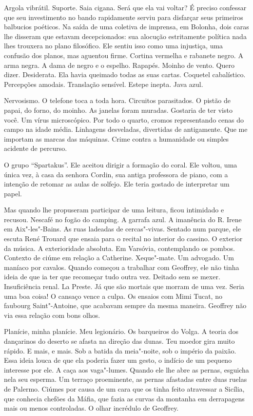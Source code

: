 Argola vibrátil. Suporte. Saia cigana. Será que ela vai voltar? É
preciso confessar que seu investimento no bando rapidamente serviu para
disfarçar seus primeiros balbucios poéticos. Na saída de uma coletiva de
imprensa, em Bolonha, dois caras lhe disseram que estavam decepcionados:
sua alocução estritamente política nada lhes trouxera no plano
filosófico. Ele sentiu isso como uma injustiça, uma confusão dos planos,
mas aguentou firme. Cortina vermelha e rabanete negro. A arma negra. A
dama de negro e o espelho. Rapapés. Moinho de vento. Quero dizer.
Desiderata. Ela havia queimado todas as suas cartas. Coquetel
cabalístico. Percepções amodais. Translação sensível. Estepe inepta.
Java azul.

Nervosismo. O telefone toca a toda hora. Circuitos parasitados. O pistão
de papai, do forno, do moinho. As janelas foram muradas. Gostaria de ter
visto você. Um vírus microscópico. Por todo o quarto, cromos
representando cenas do campo na idade média. Linhagens desveladas,
divertidas de antigamente. Que me importam as marcas das máquinas. Crime
contra a humanidade ou simples acidente de percurso.

O grupo ``Spartakus''. Ele aceitou dirigir a formação do coral. Ele
voltou, uma única vez, à casa da senhora Cordin, sua antiga professora
de piano, com a intenção de retomar as aulas de solfejo. Ele teria
gostado de interpretar um papel.

Mas quando lhe propuseram participar de uma leitura, ficou intimidado e
recusou. Nescafé no fogão do camping. A garrafa azul. A imanência do R.
Irene em Aix"-les"-Bains. As ruas ladeadas de cercas"-vivas. Sentado num
parque, ele escuta René Trouard que ensaia para o recital no interior do
cassino. O exterior da música. A exterioridade absoluta. Em Varsóvia,
contemplando os pombos. Contexto de ciúme em relação a Catherine.
Xeque"-mate. Um advogado. Um maníaco por cavalos. Quando começou a
trabalhar com Geoffrey, ele não tinha ideia de que ia ter que recomeçar
tudo outra vez. Deitado sem se mexer. Insuficiência renal. La Preste. Já
que são mortais que morram de uma vez. Seria uma boa coisa! O cansaço
vence a culpa. Os ensaios com Mimi Tucat, no faubourg Saint"-Antoine, que
acabavam sempre da mesma maneira. Geoffrey não via essa relação com bons
olhos.

Planície, minha planície. Meu legionário. Os barqueiros do Volga. A
teoria dos dançarinos do deserto se afasta na direção das dunas. Teu
moedor gira muito rápido. E mais, e mais. Sob a batida da meia"-noite,
sob o império da paixão. Essa ideia louca de que ela poderia fazer um
gesto, o indício de um pequeno interesse por ele. A caça aos vaga"-lumes.
Quando ele lhe abre as pernas, esguicha nela seu esperma. Um terraço
proeminente, as pernas afastadas entre duas ruelas de Palermo. Ciúmes
por causa de um cara que os tinha feito atravessar a Sicília, que
conhecia chefões da Máfia, que fazia as curvas da montanha em
derrapagens mais ou menos controladas. O olhar incrédulo de Geoffrey.

